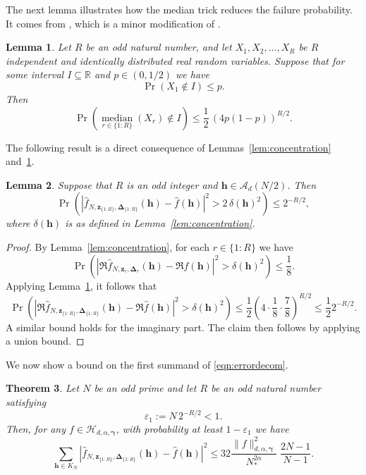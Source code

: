 \documentclass[a4paper,11pt]{article}
\newtheorem{theorem}{Theorem}[section]
\newtheorem{lemma}[theorem]{Lemma}
\newcommand{\bsh}{\boldsymbol{h}}
\newcommand{\bsz}{\boldsymbol{z}}
\newcommand{\bsgamma}{\boldsymbol{\gamma}}
\newcommand{\bsDelta}{\boldsymbol{\Delta}}
\newcommand{\RR}{\mathbb{R}}
\newcommand{\Acal}{\mathcal{A}}
\newcommand{\Hcal}{\mathcal{H}}
\begin{document}
The next lemma illustrates how the median trick reduces the failure probability. It comes from \cite[Proposition 2.2]{kunsch2019solvable}, which is a minor modification of  \cite[Proposition 2.1]{niemiro2009fixed}.

\begin{lemma}\label{lem:mediantrick}
    Let $R$ be an odd natural number, and let $X_1, X_2, \dots, X_R$ be $R$ independent and identically distributed real random variables. Suppose that for some interval $I \subseteq \RR$ and $p \in (0,1/2)$ we have
    \[
    \Pr\left(X_1 \notin I\right) \leq p.
    \]
    Then
    \[
    \Pr\left(\operatorname*{median}_{r \in \{1{:}R\}}(X_r)     \notin I\right) 
    \leq \frac{1}{2}\,(4p(1-p))^{R/2}.
    \]
\end{lemma}

The following result is a direct consequence of Lemmas~\ref{lem:concentration} and~\ref{lem:mediantrick}.

\begin{lemma}\label{lem:medianbound}
    Suppose that $R$ is an odd integer and $\bsh \in \Acal_{d}(N/2)$. Then
    \[
    \Pr\left(
    \left|\widehat{f}_{N,\bsz_{\{1{:}R\}},\bsDelta_{\{1{:}R\}}}(\bsh) - \widehat{f}(\bsh)\right|^2 > 2\,\delta(\bsh)^2 \right) \le 2^{-R/2},
\]
where $\delta(\bsh)$ is as defined in Lemma~\ref{lem:concentration}.
\end{lemma}
\begin{proof} 
    By Lemma~\ref{lem:concentration}, for each $r \in \{1{:}R\}$ we have
    \[
    \Pr\left(|\Re\widehat{f}_{N,\bsz_r,\bsDelta_r}(\bsh)-\Re\widehat{f}(\bsh)|^2> \delta(\bsh)^2\right)
    \le \frac{1}{8}. 
    \]
    Applying Lemma~\ref{lem:mediantrick}, it follows that
    \[
        \Pr\left(\left|\Re\widehat{f}_{N,\bsz_{\{1{:}R\}},\bsDelta_{\{1{:}R\}}}(\bsh)-\Re\widehat{f}(\bsh)\right|^2> \delta(\bsh)^2\right)
         \le \frac{1}{2}\left( 4\cdot \frac{1}{8}\cdot\frac{7}{8}\right)^{R/2}\leq \frac{1}{2}2^{-R/2}.
    \]
    A similar bound holds for the imaginary part. The claim then follows by applying a union bound.    
\end{proof}

We now show a bound on the first summand of \eqref{eqn:errordecom}.

\begin{theorem}\label{thm:L2rate_constants}
    Let $N$ be an odd prime and let $R$ be an odd natural number satisfying
    \begin{equation}\label{eq:choose_R_first}
    \varepsilon_1:= N\,2^{-R/2}< 1.
    \end{equation}
    Then, for any $f\in \Hcal_{d,\alpha,\bsgamma}$, with probability at least $1-\varepsilon_1$ we have
    \[
    \sum_{\bsh\in K_N}\left|\widehat{f}_{N,\bsz_{\{1{:}R\}},\bsDelta_{\{1{:}R\}}}(\bsh)-\widehat{f}(\bsh)\right|^2\le 32\frac{\|f\|^2_{d,\alpha,\bsgamma}}{N_*^{2\alpha}}\;\frac{2N-1}{N-1}.
    \]
\end{theorem}
\end{document}

